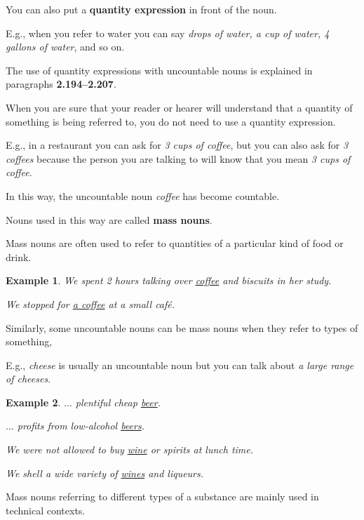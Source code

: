 \documentclass[oneside]{book}
\numberwithin{equation}{section}
\newtheorem{example}{Example}[section]
\begin{document}
%
You can also put a \textbf{quantity expression} in front of the noun.

E.g., when you refer to water you can say \textit{drops of water, a cup of water, 4 gallons of water}, and so on.

%
The use of quantity expressions with uncountable nouns is explained in paragraphs \textbf{2.194--2.207}.

%
\noindent{} When you are sure that your reader or hearer will understand that a quantity of something is being referred to, you do not need to use a quantity expression.

%
E.g., in a restaurant you can ask for \textit{3 cups of coffee}, but you can also ask for \textit{3 coffees} because the person you are talking to will know that you mean \textit{3 cups of coffee}.

In this way, the uncountable noun \textit{coffee} has become countable.

%
Nouns used in this way are called \textbf{mass nouns}.

%
\noindent{} Mass nouns are often used to refer to quantities of a particular kind of food or drink.
\begin{example}
    We spent 2 hours talking over \underline{coffee} and biscuits in her study.
    
    We stopped for \underline{a coffee} at a small caf\'e.
\end{example}
%
\noindent{} Similarly, some uncountable nouns can be mass nouns when they refer to types of something,

E.g., \textit{cheese} is usually an uncountable noun but you can talk about \textit{a large range of cheeses}.
\begin{example}
    $\ldots$ plentiful cheap \underline{beer}.
    
    $\ldots$ profits from low-alcohol \underline{beers}.
    
    We were not allowed to buy \underline{wine} or spirits at lunch time.
    
    We shell a wide variety of \underline{wines} and liqueurs.
\end{example}
Mass nouns referring to different types of a substance are mainly used in technical contexts.
\end{document}
